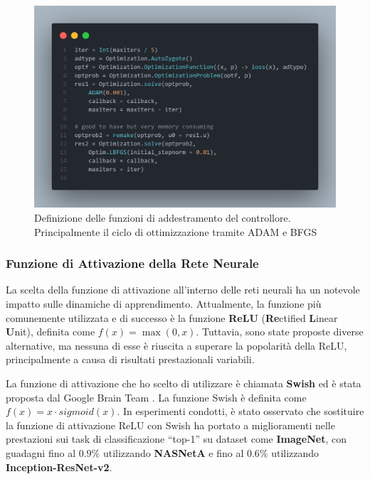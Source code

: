 \begin{figure}[H]
    \begin{center}
		\includegraphics[width=\textwidth]{img/controller3.png}
		\caption{Definizione delle funzioni di addestramento del controllore. Principalmente il ciclo di ottimizzazione tramite ADAM e BFGS}
		\label{fig:controller3}
	\end{center}
\end{figure}

\subsubsection*{Funzione di Attivazione della Rete Neurale}
La scelta della funzione di attivazione all'interno delle reti neurali 
ha un notevole impatto sulle dinamiche di apprendimento. Attualmente, 
la funzione più comunemente utilizzata e di successo è la funzione 
\textbf{ReLU} (\textbf{Re}ctified \textbf{L}inear \textbf{U}nit), 
definita come $f(x) = \max(0, x)$. Tuttavia, sono state proposte 
diverse alternative, ma nessuna di esse è riuscita a superare la 
popolarità della ReLU, principalmente a causa di risultati 
prestazionali variabili.

La funzione di attivazione che ho scelto di utilizzare è chiamata 
\textbf{Swish} ed è stata proposta dal Google Brain Team 
\cite{ramachandran2017searching}. La funzione Swish è definita 
come $f(x) = x \cdot sigmoid(x)$. In esperimenti condotti, è 
stato osservato che sostituire la funzione di attivazione ReLU 
con Swish ha portato a miglioramenti nelle prestazioni sui task 
di classificazione ``top-1'' su dataset come \textbf{ImageNet}, con 
guadagni fino al $0.9\%$ utilizzando \textbf{NASNetA} e fino al 
$0.6\%$ utilizzando \textbf{Inception-ResNet-v2}.

